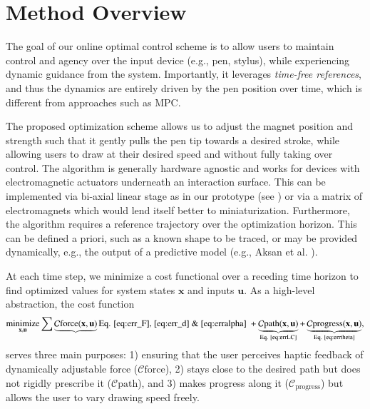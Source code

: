 \section{Method Overview}
The goal of our online optimal control scheme is to allow users to maintain control and agency over the input device (e.g., pen, stylus), while experiencing dynamic guidance from the system. Importantly, it leverages \textit{time-free references}, and thus the dynamics are entirely driven by the pen position over time, which is different from approaches such as MPC.

The proposed optimization scheme allows us to adjust the magnet position and strength such that it gently pulls the pen tip towards a desired stroke, while allowing users to draw at their desired speed and without fully taking over control. The algorithm is generally hardware agnostic and works for devices with electromagnetic actuators underneath an interaction surface. This can be implemented via bi-axial linear stage as in our prototype (see ) or via a matrix of electromagnets which would lend itself better to miniaturization. Furthermore, the algorithm requires a reference trajectory over the optimization horizon. This can be defined a priori, such as a known shape to be traced, or may be provided dynamically, e.g., the output of a predictive model (e.g., Aksan et al. \cite{Aksan:2018:DeepWriting}).

At each time step, we minimize a cost functional over a receding time horizon to find optimized values for system states $\mathbf{x}$ and inputs $\mathbf{u}$.
As a high-level abstraction, the cost function
\begin{equation}
    \underset{\mathbf{x},\mathbf{u}}{\text{minimize}} \sum 
    \underbrace{\mathcal{C}{\text{force}}(\mathbf{x},\mathbf{u})}{\text{Eq. \ref{eq:err_F}, \ref{eq:err_d} \& \ref{eq:erralpha} }} + 
    \underbrace{\mathcal{C}{ \text{path}}(\mathbf{x},\mathbf{u})}_{\text{Eq.  \ref{eq:errLC}}} +
    \underbrace{\mathcal{C}{\text{progress}}(\mathbf{x},\mathbf{u})}_{\text{Eq. \ref{eq:errtheta}}}
      \label{eq:min1},
\end{equation}
serves three main purposes: 1) ensuring that the user perceives haptic feedback of dynamically adjustable force ($\mathcal{C}{\text{force}}$), 2) stays close to the desired path but does not rigidly prescribe it ($\mathcal{C}{\text{path}}$), and 3) makes progress along it ($\mathcal{C}_{\text{progress}}$) but allows the user to vary drawing speed freely.
  
